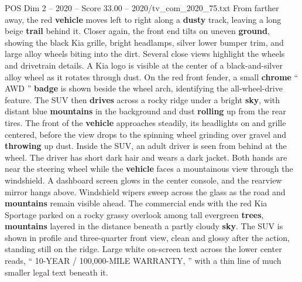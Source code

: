 \begin{textsample}{POS Dim 2 – 2020 – Score 33.00 – 2020/tv\_com\_2020\_75.txt}
From farther away, the red \textbf{vehicle} moves left to right along a \textbf{dusty} track, leaving a long beige \textbf{trail} behind it.
Closer again, the front end tilts on uneven \textbf{ground}, showing the black Kia grille, bright headlamps, silver lower bumper trim, and large alloy wheels biting into the dirt.
Several close views highlight the wheels and drivetrain details.
A Kia logo is visible at the center of a black-and-silver alloy wheel as it rotates through dust.
On the red front fender, a small \textbf{chrome} “ AWD ” \textbf{badge} is shown beside the wheel arch, identifying the all-wheel-drive feature.
The SUV then \textbf{drives} across a rocky ridge under a bright \textbf{sky}, with distant blue \textbf{mountains} in the background and dust \textbf{rolling} up from the rear tires.
The front of the \textbf{vehicle} approaches steadily, its headlights on and grille centered, before the view drops to the spinning wheel grinding over gravel and \textbf{throwing} up dust.
Inside the SUV, an adult driver is seen from behind at the wheel.
The driver has short dark hair and wears a dark jacket.
Both hands are near the steering wheel while the \textbf{vehicle} faces a mountainous view through the windshield.
A dashboard screen glows in the center console, and the rearview mirror hangs above.
Windshield wipers sweep across the glass as the road and \textbf{mountains} remain visible ahead.
The commercial ends with the red Kia Sportage parked on a rocky grassy overlook among tall evergreen \textbf{trees}, \textbf{mountains} layered in the distance beneath a partly cloudy \textbf{sky}.
The SUV is shown in profile and three-quarter front view, clean and glossy after the action, standing still on the ridge.
Large white on-screen text across the lower center reads, “ 10-YEAR / 100,000-MILE WARRANTY, ” with a thin line of much smaller legal text beneath it.

\end{textsample}
